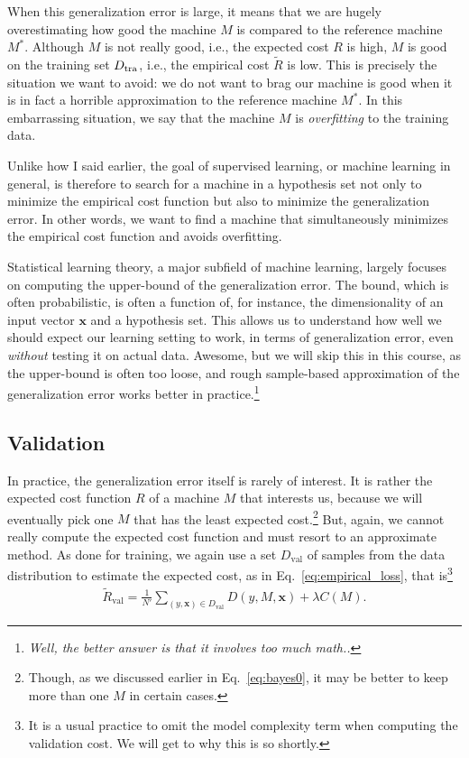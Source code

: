 \documentclass{report}
\newcommand{\vect}[1]{\mathbf{#1}}
\newcommand{\vx}[0]{\vect{x}}
\newcommand{\val}{\text{val}}
\newcommand{\tra}{\text{tra}}
\begin{document}
When this generalization error is large, it means that we are hugely
overestimating how good the machine $M$ is compared to the reference machine
$M^*$. Although $M$ is not really good, i.e., the expected cost $R$ is high, $M$
is good on the training set $D_{\text{\tra}}$, i.e., the empirical cost
$\tilde{R}$ is low. This is precisely the situation we want to avoid: we do not
want to brag our machine is good when it is in fact a horrible approximation to
the reference machine $M^*$. In this embarrassing situation, we say that the
machine $M$ is {\it overfitting} to the training data.

Unlike how I said earlier, the goal of supervised learning, or machine learning
in general, is therefore to search for a machine in a hypothesis set not only to
minimize the empirical cost function but also to minimize the generalization
error. In other words, we want to find a machine that simultaneously minimizes
the empirical cost function and avoids overfitting.

Statistical learning theory, a major subfield of machine learning, largely
focuses on computing the upper-bound of the generalization error. The bound,
which is often probabilistic, is often a function of, for instance, the
dimensionality of an input vector $\vx$ and a hypothesis set. This allows us to
understand how well we should expect our learning setting to work, in terms of
generalization error, even {\it without} testing it on actual data. Awesome, but
we will skip this in this course, as the upper-bound is often too loose, and
rough sample-based approximation of the generalization error works better in
practice.\footnote{
    {\it Well, the better answer is that it involves too much math..}
} 

\subsection{Validation}
\label{sec:validation}

In practice, the generalization error itself is rarely of interest. It is rather
the expected cost function $R$ of a machine $M$ that interests us, because we
will eventually pick one $M$ that has the least expected cost.\footnote{
    Though, as we discussed earlier in Eq.~\eqref{eq:bayes0}, it may be better
    to keep more than one $M$ in certain cases. 
} But, again, we cannot really compute the expected cost function and must
resort to an approximate method. As done for training, we again use a set
$D_{\val}$ of samples from the data distribution to estimate the expected cost,
as in Eq.~\eqref{eq:empirical_loss}, that is\footnote{
    It is a usual practice to omit the model complexity term when computing the
    validation cost. We will get to why this is so shortly.
}
\begin{align*}
    \tilde{R}_{\val} = \frac{1}{N'} \sum_{(y, \vx) \in D_{\val}} D(y, M, \vx)
    + \lambda C(M).
\end{align*}
\end{document}
